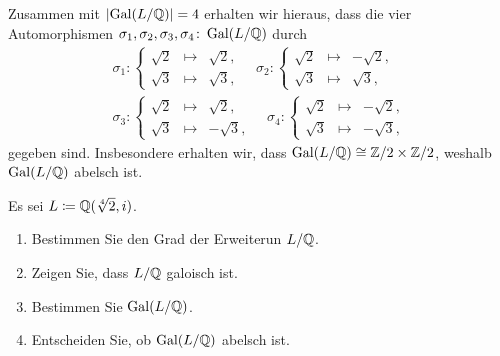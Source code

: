 \begin{solution}
\begin{enumerate}
      Zusammen mit $|{\operatorname{Gal}(L / \mathbb{Q})}| = 4$ erhalten wir hieraus, dass die vier Automorphismen $\sigma_1, \sigma_2, \sigma_3, \sigma_4 \colon \operatorname{Gal}(L / \mathbb{Q})$ durch
      \begin{gather*}
        \sigma_1 \colon
        \left\{
          \begin{array}{ccr}
            \sqrt{2} & \mapsto  & \sqrt{2}, \\
            \sqrt{3} & \mapsto  & \sqrt{3},
          \end{array}
        \right.
        \quad
        \sigma_2 \colon
        \left\{
          \begin{array}{ccr}
            \sqrt{2} & \mapsto  & -\sqrt{2},  \\
            \sqrt{3} & \mapsto  &  \sqrt{3},
          \end{array}
        \right.
        \\
        \sigma_3 \colon
        \left\{
          \begin{array}{ccr}
            \sqrt{2} & \mapsto  &  \sqrt{2},  \\
            \sqrt{3} & \mapsto  & -\sqrt{3},
          \end{array}
        \right.
        \quad
        \sigma_4 \colon
        \left\{
          \begin{array}{ccr}
            \sqrt{2} & \mapsto  & -\sqrt{2},  \\
            \sqrt{3} & \mapsto  & -\sqrt{3},
          \end{array}
        \right.
      \end{gather*}
      gegeben sind.
      Insbesondere erhalten wir, dass $\operatorname{Gal}(L / \mathbb{Q}) \cong \mathbb{Z}/2 \times \mathbb{Z}/2$,
      weshalb $\operatorname{Gal}(L / \mathbb{Q})$ abelsch ist.
  \end{enumerate}
\end{solution}



\begin{question}
  Es sei $L \coloneqq \mathbb{Q}(\sqrt[4]{2}, i)$.
  \begin{enumerate}
    \item
      Bestimmen Sie den Grad der Erweiterun $L/\mathbb{Q}$.
    \item
      Zeigen Sie, dass $L/\mathbb{Q}$ galoisch ist.
    \item
      Bestimmen Sie $\operatorname{Gal}(L / \mathbb{Q})$.
    \item
      Entscheiden Sie, ob $\operatorname{Gal}(L / \mathbb{Q})$ abelsch ist.
  \end{enumerate}
\end{question}


